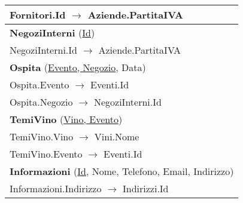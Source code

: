 \begin{center}
\begin{minipage}[t]{7.5cm}
{\begin{tabular}{P{7.5cm}}
				\midrule
				Fornitori.Id $\to$ Aziende.PartitaIVA \\                                
				\midrule
				 \textbf{NegoziInterni} (\underline{Id})                                              \\
				\midrule
				NegoziInterni.Id $\to$ Aziende.PartitaIVA \\                                
				\midrule
				 \textbf{Ospita} (\underline{Evento, Negozio}, Data)                                  \\
				\midrule
				Ospita.Evento $\to$ Eventi.Id                                                                                         \\
				\midrule
				Ospita.Negozio $\to$ NegoziInterni.Id                                                                                 \\                                
				\midrule
				 \textbf{TemiVino} (\underline{Vino, Evento})                                         \\
				\midrule
				TemiVino.Vino $\to$ Vini.Nome                                                                                         \\
				\midrule
				TemiVino.Evento $\to$ Eventi.Id                                                                                       \\                                
				\midrule
				 \textbf{Informazioni} (\underline{Id}, Nome, Telefono, Email, Indirizzo)                                              \\
				\midrule
				Informazioni.Indirizzo $\to$ Indirizzi.Id                                                                                                              \\                                
				\midrule
			\end{tabular}
		}
	\end{minipage}
	\hspace{5mm}
	\begin{minipage}[t]{7.5cm}
\end{minipage}
\end{center}
